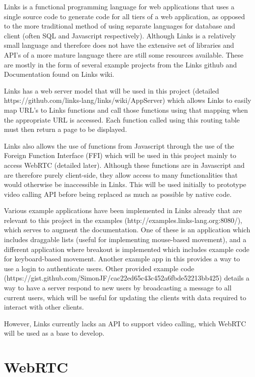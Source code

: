 \documentclass[bsc,frontabs,singlespacing,parskip,deptreport]{infthesis}
\begin{document}
Links is a functional programming language for web applications that uses a single source code to generate code for all tiers of a web application, as opposed to the more traditional method of using separate languages for database and client (often SQL and Javascript respectively).  Although Links is a relatively small language and therefore does not have the extensive set of libraries and API’s of a more mature language there are still some resources available.  These are mostly in the form of several example projects from the Links github and Documentation found on Links wiki.

Links has a web server model that will be used in this project (detailed https://github.com/links-lang/links/wiki/AppServer) which allows Links to easily map URL’s to Links functions and call those functions using that mapping when the appropriate URL is accessed.  Each function called using this routing table must then return a page to be displayed.

Links also allows the use of functions from Javascript through the use of the Foreign Function Interface (FFI) which will be used in this project mainly to access WebRTC (detailed later).  Although these functions are in Javascript and are therefore purely client-side, they allow access to many functionalities that would otherwise be inaccessible in Links.  This will be used initially to prototype video calling API before being replaced as much as possible by native code.

Various example applications have been implemented in Links already that are relevant to this project in the examples (http://examples.links-lang.org:8080/), which serves to augment the documentation.  One of these is an application which includes draggable lists (useful for implementing mouse-based movement), and a different application where breakout is implemented which includes example code for keyboard-based movement.  Another example app in this provides a way to use a login to authenticate users.  Other provided example code (https://gist.github.com/SimonJF/cac22ed65c43c452a6fbde52213bb425) details a way to have a server respond to new users by broadcasting a message to all current users, which will be useful for updating the clients with data required to interact with other clients.

However, Links currently lacks an API to support video calling, which WebRTC will be used as a base to develop.

\section{WebRTC}
\end{document}

